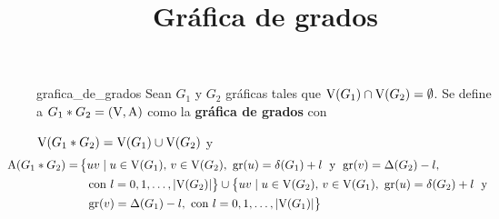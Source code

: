 \documentclass[fleqn, 11pt]{beamer}
\title{Gráfica de grados}
\begin{document}
    \begin{definicion}[beforeafter skip = 4mm]{}{grafica_de_grados}
        Sean $ G_1 $ y $ G_2 $ gráficas tales que $ \textnormal{V}(G_1) \cap \textnormal{V}(G_2) = \emptyset $. Se define a $ G_1 \ast G_2 = (\textnormal{V}, \textnormal{A}) $ como la \textbf{gráfica de grados} con \vspace{2mm}
        
        $ \textnormal{V}(G_1 \ast G_2) = \textnormal{V}(G_1) \cup \textnormal{V}(G_2) $ \quad y \vspace{-1mm}
        \begin{align*}
            \hspace{-9mm} \textnormal{A}(G_1 \ast G_2) =& \left\{ uv \mid u \in \textnormal{V}(G_1), \, v \in \textnormal{V}(G_2), \textnormal{ gr}(u) = \delta(G_1) + l \phantom{|_i^i} \textnormal{y} \phantom{|_i^i} \textnormal{gr}(v) = \Delta(G_2) - l, \right. \\
            & \left. \phantom{|_i^i} \textnormal{con } l = 0,1, \ldots, \lvert \textnormal{V}(G_2) \rvert \right\} \cup  \left\{ uv \mid u \in \textnormal{V}(G_2), \, v \in \textnormal{V}(G_1), \textnormal{ gr}(u) = \delta(G_2) + l \phantom{|_i^i} \textnormal{y } \right. \\
            & \left. \phantom{|_i^i} \textnormal{gr}(v) = \Delta(G_1) - l, \textnormal{ con } l = 0,1, \ldots, \lvert \textnormal{V}(G_1) \rvert \right\}
        \end{align*}
    \end{definicion}
\end{document}

